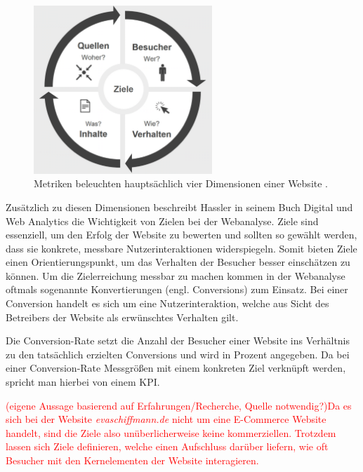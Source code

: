 \begin{figure}[H]
    \centering
    \includegraphics[width=0.6\textwidth, keepaspectratio]{images/dimensionen.png}
    \caption{Metriken beleuchten hauptsächlich vier Dimensionen einer Website \parencite[Kap.5.7]{Hassler2019}.}
    \label{fig:dimensionen}
\end{figure}


Zusätzlich zu diesen Dimensionen beschreibt Hassler in seinem Buch \glqq Digital und Web Analytics\grqq{} die Wichtigkeit von Zielen bei der Webanalyse. Ziele sind essenziell, um den Erfolg der Website zu bewerten und sollten so gewählt werden, dass sie konkrete, messbare Nutzerinteraktionen widerspiegeln. Somit bieten Ziele einen Orientierungspunkt, um das Verhalten der Besucher besser einschätzen zu können. Um die Zielerreichung messbar zu machen kommen in der Webanalyse oftmals sogenannte Konvertierungen (engl. Conversions) zum Einsatz. Bei einer Conversion handelt es sich um eine Nutzerinteraktion, welche aus Sicht des Betreibers der Website als erwünschtes Verhalten gilt. \parencite[Kap.13]{Hassler2019}

Die Conversion-Rate setzt die Anzahl der Besucher einer Website ins Verhältnis zu den tatsächlich erzielten Conversions und wird in Prozent angegeben. Da bei einer Conversion-Rate Messgrößen mit einem konkreten Ziel verknüpft werden, spricht man hierbei von einem KPI. \parencite{RyteConversion}

\textcolor{red}{
    (eigene Aussage basierend auf Erfahrungen/Recherche, Quelle notwendig?)Da es sich bei der Website \textit{evaschiffmann.de} nicht um eine E-Commerce Website handelt, sind die Ziele also unüberlicherweise keine kommerziellen. Trotzdem lassen sich Ziele definieren, welche einen Aufschluss darüber liefern, wie oft Besucher mit den Kernelementen der Website interagieren.
}

